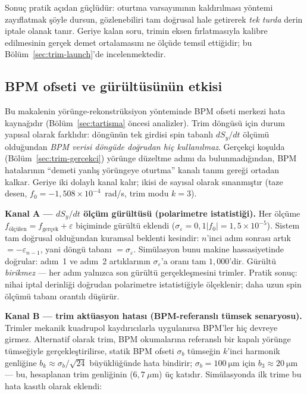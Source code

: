 \documentclass[preprint,12pt]{elsarticle}
\begin{document}
Sonuç pratik açıdan güçlüdür: oturtma varsayımının kaldırılması yöntemi
zayıflatmak şöyle dursun, gözlenebiliri tam doğrusal hale getirerek
\emph{tek turda} derin iptale olanak tanır. Geriye kalan soru,
trimin eksen fırlatmasıyla kalibre edilmesinin gerçek demet ortalamasını
ne ölçüde temsil ettiğidir; bu Bölüm~\ref{sec:trim-launch}'de incelenmektedir.

\subsection{BPM ofseti ve gürültüsünün etkisi}
\label{sec:trim-bpm}

Bu makalenin yörünge-rekonstrüksiyon yönteminde BPM ofseti merkezi hata
kaynağıdır (Bölüm~\ref{sec:tartisma} öncesi analizler). Trim döngüsü için
durum yapısal olarak farklıdır: döngünün tek girdisi spin tabanlı
$dS_y/dt$ ölçümü olduğundan \emph{BPM verisi döngüde doğrudan hiç
kullanılmaz}. Gerçekçi koşulda (Bölüm~\ref{sec:trim-gercekci}) yörünge
düzeltme adımı da bulunmadığından, BPM hatalarının ``demeti yanlış
yörüngeye oturtma'' kanalı tanım gereği ortadan kalkar. Geriye iki dolaylı
kanal kalır; ikisi de sayısal olarak sınanmıştır (taze desen,
$f_0=-1{,}508\times10^{-4}$~rad/s, trim modu $k=3$).

\textbf{Kanal A — $dS_y/dt$ ölçüm gürültüsü (polarimetre istatistiği).}
Her ölçüme $f_\mathrm{ölçülen}=f_\mathrm{gerçek}+\varepsilon$ biçiminde
gürültü eklendi ($\sigma_\varepsilon = 0{,}1|f_0| = 1{,}5\times10^{-5}$).
Sistem tam doğrusal olduğundan kuramsal beklenti kesindir: $n$'inci adım
sonrası artık $= -\varepsilon_{n-1}$, yani döngü tabanı
$=\sigma_\varepsilon$. Simülasyon bunu makine hassasiyetinde doğrular:
adım~1 ve adım~2 artıklarının $\sigma_\varepsilon$'a oranı tam
$1{,}000$'dir. Gürültü \emph{birikmez} — her adım yalnızca son gürültü
gerçekleşmesini trimler. Pratik sonuç: nihai iptal derinliği doğrudan
polarimetre istatistiğiyle ölçeklenir; daha uzun spin ölçümü tabanı
orantılı düşürür.

\textbf{Kanal B — trim aktüasyon hatası (BPM-referanslı tümsek senaryosu).}
Trimler mekanik kuadrupol kaydırıcılarla uygulanırsa BPM'ler hiç devreye
girmez. Alternatif olarak trim, BPM okumalarına referanslı bir kapalı
yörünge tümseğiyle gerçekleştirilirse, statik BPM ofseti $\sigma_b$
tümseğin $k$'inci harmonik genliğine $b_k\approx\sigma_b/\sqrt{24}$
büyüklüğünde hata bindirir; $\sigma_b=\SI{100}{\micro\meter}$ için
$b_3\approx\SI{20}{\micro\meter}$ — bu, hesaplanan trim genliğinin
($6{,}7~\mu$m) üç katıdır. Simülasyonda ilk trime bu hata kasıtlı olarak
eklendi:
\end{document}
